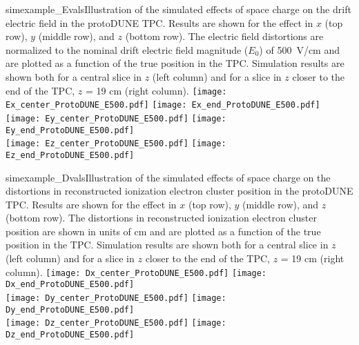 \begin{cdrfigure}{simexample_Evals}{Illustration of the simulated effects of space charge on the drift electric field in the protoDUNE TPC.  Results are shown for the effect in $x$ (top row), $y$ (middle row), and $z$ (bottom row).  The electric field distortions are normalized to the nominal drift electric field magnitude ($E_{0}$) of 500~V/cm and are plotted as a function of the true position in the TPC.  Simulation results are shown both for a central slice in $z$ (left column) and for a slice in $z$ closer to the end of the TPC, $z$ = 19 cm (right column).}
\texttt{[image: Ex\_center\_ProtoDUNE\_E500.pdf]}
\texttt{[image: Ex\_end\_ProtoDUNE\_E500.pdf]}
\\
\texttt{[image: Ey\_center\_ProtoDUNE\_E500.pdf]}
\texttt{[image: Ey\_end\_ProtoDUNE\_E500.pdf]}
\\
\texttt{[image: Ez\_center\_ProtoDUNE\_E500.pdf]}
\texttt{[image: Ez\_end\_ProtoDUNE\_E500.pdf]}
\end{cdrfigure}


\begin{cdrfigure}{simexample_Dvals}{Illustration of the simulated effects of space charge on the distortions in reconstructed ionization electron cluster position in the protoDUNE TPC.  Results are shown for the effect in $x$ (top row), $y$ (middle row), and $z$ (bottom row).  The distortions in reconstructed ionization electron cluster position are shown in units of cm and are plotted as a function of the true position in the TPC.  Simulation results are shown both for a central slice in $z$ (left column) and for a slice in $z$ closer to the end of the TPC, $z$ = 19 cm (right column).}
\texttt{[image: Dx\_center\_ProtoDUNE\_E500.pdf]}
\texttt{[image: Dx\_end\_ProtoDUNE\_E500.pdf]}
\\
\texttt{[image: Dy\_center\_ProtoDUNE\_E500.pdf]}
\texttt{[image: Dy\_end\_ProtoDUNE\_E500.pdf]}
\\
\texttt{[image: Dz\_center\_ProtoDUNE\_E500.pdf]}
\texttt{[image: Dz\_end\_ProtoDUNE\_E500.pdf]}
\end{cdrfigure}




